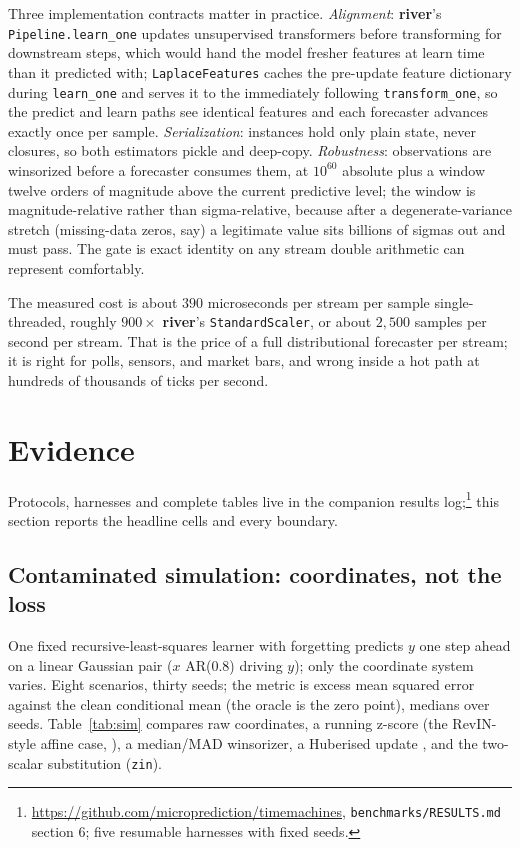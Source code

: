 \documentclass[article]{jss}
\providecommand{\pkg}[1]{\textbf{#1}}
\providecommand{\code}[1]{\texttt{#1}}
\theoremstyle{remark}
\begin{document}
Three implementation contracts matter in practice. \emph{Alignment}:
\pkg{river}'s \code{Pipeline.learn\_one} updates unsupervised transformers
before transforming for downstream steps, which would hand the model fresher
features at learn time than it predicted with; \code{LaplaceFeatures} caches
the pre-update feature dictionary during \code{learn\_one} and serves it to
the immediately following \code{transform\_one}, so the predict and learn
paths see identical features and each forecaster advances exactly once per
sample. \emph{Serialization}: instances hold only plain state, never
closures, so both estimators pickle and deep-copy. \emph{Robustness}:
observations are winsorized before a forecaster consumes them, at $10^{60}$
absolute plus a window twelve orders of magnitude above the current
predictive level; the window is magnitude-relative rather than
sigma-relative, because after a degenerate-variance stretch (missing-data
zeros, say) a legitimate value sits billions of sigmas out and must pass. The
gate is exact identity on any stream double arithmetic can represent
comfortably.

The measured cost is about $390$ microseconds per stream per sample
single-threaded, roughly $900\times$ \pkg{river}'s \code{StandardScaler}, or
about $2{,}500$ samples per second per stream. That is the price of a full
distributional forecaster per stream; it is right for polls, sensors, and
market bars, and wrong inside a hot path at hundreds of thousands of ticks
per second.

\section{Evidence} \label{sec:evidence}

Protocols, harnesses and complete tables live in the companion results
log;\footnote{\url{https://github.com/microprediction/timemachines},
\code{benchmarks/RESULTS.md} section 6; five resumable harnesses with fixed
seeds.} this section reports the headline cells and every boundary.

\subsection{Contaminated simulation: coordinates, not the loss}

One fixed recursive-least-squares learner with forgetting predicts $y$ one
step ahead on a linear Gaussian pair ($x$ AR(0.8) driving $y$); only the
coordinate system varies. Eight scenarios, thirty seeds; the metric is excess
mean squared error against the clean conditional mean (the oracle is the zero
point), medians over seeds. Table~\ref{tab:sim} compares raw coordinates, a
running z-score (the RevIN-style affine case,
\citealp{kim2021reversible}), a median/MAD winsorizer, a Huberised update
\citep{huber1964}, and the two-scalar substitution (\code{zin}).
\end{document}

